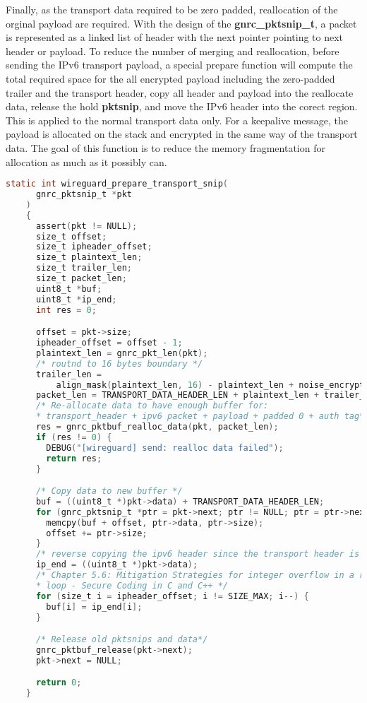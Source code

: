   Finally, as the transport data required to be zero padded, reallocation of the orginal payload
  are required. With the design of the \textbf{gnrc{\_}pktsnip{\_}t}, a packet is represented as
  a linked list of header with the next pointer pointing to next header or payload. To reduce
  the number of merging and reallocation, before sending the IPv6 transport payload, a special
  prepare function will compute the total required space for the all encrypted payload including
  the zero-padded trailer and the transport header, copy all header and payload into
  the reallocate data, release the hold \textbf{pktsnip}, and move the IPv6 header
  into the corect region. This is applied to the normal transport data only. For a keepalive message,
  the payload is allocated on the stack and encrypted in the same way of the transport data.
  The goal of this function is to reduce the memory fragmentation for allocation as much
  as it possibly can.
  \begin{lstlisting}[caption = The flow of transport data preparation,language=C, label={lst:prep}]
    static int wireguard_prepare_transport_snip(
      gnrc_pktsnip_t *pkt
    ) 
    {
      assert(pkt != NULL);
      size_t offset;
      size_t ipheader_offset;
      size_t plaintext_len;
      size_t trailer_len;
      size_t packet_len;
      uint8_t *buf;
      uint8_t *ip_end;
      int res = 0;

      offset = pkt->size;
      ipheader_offset = offset - 1;
      plaintext_len = gnrc_pkt_len(pkt);
      /* routnd to 16 bytes boundary */
      trailer_len =
          align_mask(plaintext_len, 16) - plaintext_len + noise_encrypted_len(0);
      packet_len = TRANSPORT_DATA_HEADER_LEN + plaintext_len + trailer_len;
      /* Re-allocate data to have enough buffer for:
      * transport_header + ipv6 packet + payload + padded 0 + auth tag*/
      res = gnrc_pktbuf_realloc_data(pkt, packet_len);
      if (res != 0) {
        DEBUG("[wireguard] send: realloc data failed");
        return res;
      }

      /* Copy data to new buffer */
      buf = ((uint8_t *)pkt->data) + TRANSPORT_DATA_HEADER_LEN;
      for (gnrc_pktsnip_t *ptr = pkt->next; ptr != NULL; ptr = ptr->next) {
        memcpy(buf + offset, ptr->data, ptr->size);
        offset += ptr->size;
      }
      /* reverse copying the ipv6 header since the transport header is shorter */
      ip_end = ((uint8_t *)pkt->data);
      /* Chapter 5.6: Mitigation Strategies for integer overflow in a reverse for
      * loop - Secure Coding in C and C++ */
      for (size_t i = ipheader_offset; i != SIZE_MAX; i--) {
        buf[i] = ip_end[i];
      }

      /* Release old pktsnips and data*/
      gnrc_pktbuf_release(pkt->next);
      pkt->next = NULL;

      return 0;
    }
  \end{lstlisting}


